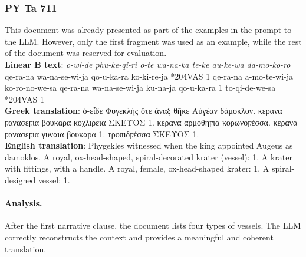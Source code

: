 \subsubsection{PY Ta 711}
This document was already presented as part of the examples in the prompt to the LLM.
However, only the first fragment was used as an example, while the rest of the document was reserved for evaluation. \\
\textbf{Linear B text}: \textit{o-wi-de phu-ke-qi-ri o-te wa-na-ka te-ke au-ke-wa da-mo-ko-ro} qe-ra-na wa-na-se-wi-ja qo-u-ka-ra ko-ki-re-ja *204VAS 1 qe-ra-na a-mo-te-wi-ja ko-ro-no-we-sa qe-ra-na wa-na-se-wi-ja ku-na-ja qo-u-ka-ra 1 to-qi-de-we-sa *204VAS 1 \\
\textbf{Greek translation}: \textgreek{ὀ-εἶδε Φυγεκλής ὅτε ἄναξ θῆκε Αὐγέαν δάμοκλον. κερανα ϝανασεϝια βουκαρα κοχλιρεια ΣΚΕΥΟΣ 1. κερανα αρμοθηϝια κορωνοϝέσσα. κερανα ϝανασεϝια γυναια βουκαρα 1. τροπιδϝέσσα ΣΚΕΥΟΣ 1.} \\
\textbf{English translation}: Phygekles witnessed when the king appointed Augeus as damoklos. A royal, ox-head-shaped, spiral-decorated krater (vessel): 1. A krater with fittings, with a handle. A royal, female, ox-head-shaped krater: 1. A spiral-designed vessel: 1.

\paragraph{Analysis.}
After the first narrative clause, the document lists four types of vessels.
The LLM correctly reconstructs the context and provides a meaningful and coherent translation.

